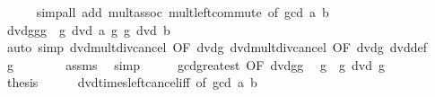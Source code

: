 \begin{isabellebody}
\ \ \ \ \isamarkupfalse%
\ {\isacharparenleft}{\kern0pt}simp{\isacharunderscore}{\kern0pt}all\ add{\isacharcolon}{\kern0pt}\ mult{\isachardot}{\kern0pt}assoc\ mult{\isachardot}{\kern0pt}left{\isacharunderscore}{\kern0pt}commute\ {\isacharbrackleft}{\kern0pt}of\ {\isachardoublequoteopen}gcd\ a\ b{\isachardoublequoteclose}{\isacharbrackright}{\kern0pt}{\isacharparenright}{\kern0pt}\isanewline
\ \ \isamarkupfalse%
\ \isamarkupfalse%
\ dvdgg{\isacharprime}{\kern0pt}{\isacharcolon}{\kern0pt}{\isachardoublequoteopen}{\isacharquery}{\kern0pt}g\ {\isacharasterisk}{\kern0pt}\ {\isacharquery}{\kern0pt}g{\isacharprime}{\kern0pt}\ dvd\ a{\isachardoublequoteclose}\ {\isachardoublequoteopen}{\isacharquery}{\kern0pt}g{\isacharasterisk}{\kern0pt}\ {\isacharquery}{\kern0pt}g{\isacharprime}{\kern0pt}\ dvd\ b{\isachardoublequoteclose}\isanewline
\ \ \ \ \isamarkupfalse%
\ {\isacharparenleft}{\kern0pt}auto\ simp{\isacharcolon}{\kern0pt}\ dvd{\isacharunderscore}{\kern0pt}mult{\isacharunderscore}{\kern0pt}div{\isacharunderscore}{\kern0pt}cancel\ {\isacharbrackleft}{\kern0pt}OF\ dvdg{\isacharparenleft}{\kern0pt}{}{\isacharparenright}{\kern0pt}{\isacharbrackright}{\kern0pt}\ dvd{\isacharunderscore}{\kern0pt}mult{\isacharunderscore}{\kern0pt}div{\isacharunderscore}{\kern0pt}cancel\ {\isacharbrackleft}{\kern0pt}OF\ dvdg{\isacharparenleft}{\kern0pt}{}{\isacharparenright}{\kern0pt}{\isacharbrackright}{\kern0pt}\ dvd{\isacharunderscore}{\kern0pt}def{\isacharparenright}{\kern0pt}\isanewline
\ \ \isamarkupfalse%
\ {\isachardoublequoteopen}{\isacharquery}{\kern0pt}g\ {\isasymnoteq}\ {}{\isachardoublequoteclose}\isanewline
\ \ \ \ \isamarkupfalse%
\ assms\ \isamarkupfalse%
\ simp\isanewline
\ \ \isamarkupfalse%
\ \isamarkupfalse%
\ gcd{\isacharunderscore}{\kern0pt}greatest\ {\isacharbrackleft}{\kern0pt}OF\ dvdgg{\isacharprime}{\kern0pt}{\isacharbrackright}{\kern0pt}\ \isamarkupfalse%
\ {\isachardoublequoteopen}{\isacharquery}{\kern0pt}g\ {\isacharasterisk}{\kern0pt}\ {\isacharquery}{\kern0pt}g{\isacharprime}{\kern0pt}\ dvd\ {\isacharquery}{\kern0pt}g{\isachardoublequoteclose}\ \isacommand{{\isachardot}{\kern0pt}}\isamarkupfalse%
\isanewline
\ \ \isamarkupfalse%
\ \isamarkupfalse%
\ {\isacharquery}{\kern0pt}thesis\isanewline
\ \ \ \ \isamarkupfalse%
\ dvd{\isacharunderscore}{\kern0pt}times{\isacharunderscore}{\kern0pt}left{\isacharunderscore}{\kern0pt}cancel{\isacharunderscore}{\kern0pt}iff\ {\isacharbrackleft}{\kern0pt}of\ {\isachardoublequoteopen}gcd\ a\ b{\isachardoublequoteclose}\ {\isacharunderscore}{\kern0pt}\ {}{\isacharbrackright}{\kern0pt}\isanewline

\end{isabellebody}
